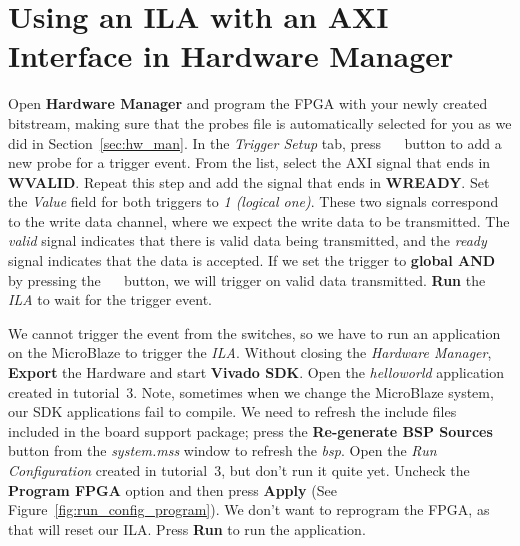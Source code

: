 \documentclass[11pt]{article}
\begin{document}
\section{Using an ILA with an AXI Interface in Hardware Manager}
\label{sec:hw_man2}
Open \textbf{Hardware Manager} and program the FPGA with your newly created bitstream, making sure that the probes file is automatically selected for you as we did in Section~\ref{sec:hw_man}. In the \textit{Trigger Setup} tab, press
~~
button to add a new probe for a trigger event. From the list, select the AXI signal that ends in \textbf{WVALID}. Repeat this step and add the signal that ends in \textbf{WREADY}. Set the \textit{Value} field for both triggers to \textit{1 (logical one)}. These two signals correspond to the write data channel, where we expect the write data to be transmitted. The \textit{valid} signal indicates that there is valid data being transmitted, and the \textit{ready} signal indicates that the data is accepted. If we set the trigger to \textbf{global AND} by pressing the 
~~
button, we will trigger on valid data transmitted. \textbf{Run} the \textit{ILA} to wait for  the trigger event.

We cannot trigger the event from the switches, so we have to run an application on the MicroBlaze to trigger the \textit{ILA}. Without closing the \textit{Hardware Manager}, \textbf{Export} the Hardware and start \textbf{Vivado SDK}. Open the \textit{helloworld} application created in tutorial~3. Note, sometimes when we change the MicroBlaze system, our SDK applications fail to compile. We need to refresh the include files included in the board support package; press the \textbf{Re-generate BSP Sources} button from the \textit{system.mss} window to refresh the \textit{bsp}.
Open the \textit{Run Configuration} created in tutorial~3, but don't run it quite yet. Uncheck the \textbf{Program FPGA} option and then press \textbf{Apply} (See Figure~\ref{fig:run_config_program}). We don't want to reprogram the FPGA, as that will reset our ILA. Press \textbf{Run} to run the application.
\end{document}
